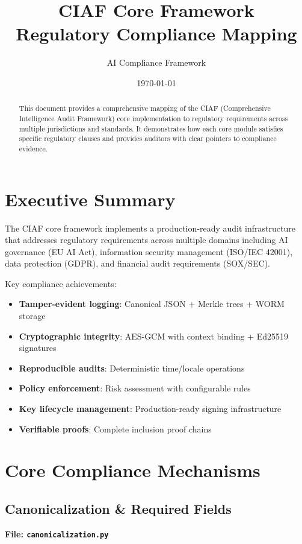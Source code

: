 \documentclass[11pt,a4paper]{article}
\title{CIAF Core Framework\\Regulatory Compliance Mapping}
\author{AI Compliance Framework}
\date{\today}
\begin{document}
\maketitle

\begin{abstract}
This document provides a comprehensive mapping of the CIAF (Comprehensive Intelligence Audit Framework) core implementation to regulatory requirements across multiple jurisdictions and standards. It demonstrates how each core module satisfies specific regulatory clauses and provides auditors with clear pointers to compliance evidence.
\end{abstract}

\tableofcontents
\newpage

\section{Executive Summary}

The CIAF core framework implements a production-ready audit infrastructure that addresses regulatory requirements across multiple domains including AI governance (EU AI Act), information security management (ISO/IEC 42001), data protection (GDPR), and financial audit requirements (SOX/SEC). 

Key compliance achievements:
\begin{itemize}
    \item \textbf{Tamper-evident logging}: Canonical JSON + Merkle trees + WORM storage
    \item \textbf{Cryptographic integrity}: AES-GCM with context binding + Ed25519 signatures
    \item \textbf{Reproducible audits}: Deterministic time/locale operations
    \item \textbf{Policy enforcement}: Risk assessment with configurable rules
    \item \textbf{Key lifecycle management}: Production-ready signing infrastructure
    \item \textbf{Verifiable proofs}: Complete inclusion proof chains
\end{itemize}

\section{Core Compliance Mechanisms}

\subsection{Canonicalization \& Required Fields}
\textbf{File: \texttt{canonicalization.py}}
\end{document}
